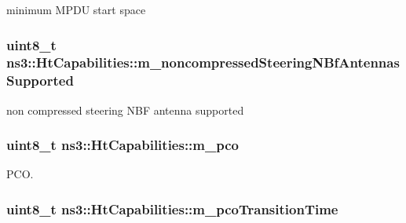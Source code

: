 minimum M\+P\+DU start space 

\subsubsection[{\texorpdfstring{m\+\_\+noncompressed\+Steering\+N\+Bf\+Antennas\+Supported}{m_noncompressedSteeringNBfAntennasSupported}}]{\setlength{\rightskip}{0pt plus 5cm}uint8\+\_\+t ns3\+::\+Ht\+Capabilities\+::m\+\_\+noncompressed\+Steering\+N\+Bf\+Antennas\+Supported\hspace{0.3cm}{\ttfamily [private]}}\hypertarget{classns3_1_1HtCapabilities_ae7be4921a53fffad597527cc2b1fceac}{}\label{classns3_1_1HtCapabilities_ae7be4921a53fffad597527cc2b1fceac}


non compressed steering N\+BF antenna supported 

\subsubsection[{\texorpdfstring{m\+\_\+pco}{m_pco}}]{\setlength{\rightskip}{0pt plus 5cm}uint8\+\_\+t ns3\+::\+Ht\+Capabilities\+::m\+\_\+pco\hspace{0.3cm}{\ttfamily [private]}}\hypertarget{classns3_1_1HtCapabilities_a64f014b091b83a3c29ba54109299a12d}{}\label{classns3_1_1HtCapabilities_a64f014b091b83a3c29ba54109299a12d}


P\+CO. 

\subsubsection[{\texorpdfstring{m\+\_\+pco\+Transition\+Time}{m_pcoTransitionTime}}]{\setlength{\rightskip}{0pt plus 5cm}uint8\+\_\+t ns3\+::\+Ht\+Capabilities\+::m\+\_\+pco\+Transition\+Time\hspace{0.3cm}{\ttfamily [private]}}\hypertarget{classns3_1_1HtCapabilities_a9736ce9e122507b9bc3c733047192dda}{}\label{classns3_1_1HtCapabilities_a9736ce9e122507b9bc3c733047192dda}


